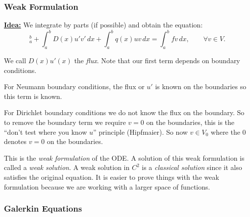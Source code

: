 \documentclass[12pt, a4paper]{article}
\theoremstyle{definition}
\theoremstyle{remark}
\numberwithin{equation}{section}
\begin{document}
\subsubsection{Weak Formulation}

{\bf\underline{Idea:}} We integrate by parts (if possible) and obtain the equation:
\begin{equation*}
[-D(x)u'v]_{a}^{b}+\int_a^b D(x)u'v' \,dx + \int_a^b q(x)uv\,dx=\int_a^b fv\,dx, \qquad \forall v \in V.
\end{equation*}

We call $D(x) u'(x)$ the \emph{flux}. Note that our first term depends on boundary conditions.

For Neumann boundary conditions, the flux or $u'$ is known on the boundaries so this term is known.

For Dirichlet boundary conditions we do not know the flux on the boundary. So to remove the boundary term we require $v=0$ on the boundaries, this is the ``don't test where you know $u$'' principle (Hipfmaier). So now $v \in V_0$ where the $0$ denotes $v=0$ on the boundaries.

This is the \emph{weak formulation} of the ODE.
A solution of this weak formulation is called a \emph{weak solution}. A weak solution in $C^2$ is a \emph{classical solution} since it also satisfies the original equation.
It is easier to prove things with the weak formulation because we are working with a larger space of functions.

\subsubsection{Galerkin Equations}
\end{document}
